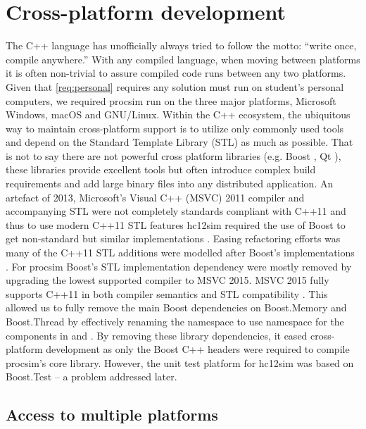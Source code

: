 \section{Cross-platform development}
\label{sec:cross-platform:sec:cross-platform-development}

The C++ language has unofficially always tried to follow the motto: ``write once, compile anywhere.'' With any compiled language, when moving between platforms it is often non-trivial to assure compiled code runs between any two platforms. Given that \cref{req:personal} requires any solution must run on student's personal computers, we required procsim run on the three major platforms, Microsoft Windows, macOS and GNU/Linux. Within the C++ ecosystem, the ubiquitous way to maintain cross-platform support is to utilize only commonly used tools and depend on the Standard Template Library (STL) as much as possible. That is not to say there are not powerful cross platform libraries (e.g. Boost \cite{Boost}, Qt \cite{Qt}), these libraries provide excellent tools but often introduce complex build requirements and add large binary files into any distributed application. An artefact of 2013, Microsoft's Visual C++ (MSVC) 2011 compiler and accompanying STL were not completely standards compliant with C++11 and thus to use modern C++11 STL features hc12sim required the use of Boost to get non-standard but similar implementations \cite{Microsoft:MSVC:ModernCPP:2011}. Easing refactoring efforts was many of the C++11 STL additions were modelled after Boost's implementations \cite{Meyers2005}. For procsim Boost's STL implementation dependency were mostly removed by upgrading the lowest supported compiler to MSVC 2015. MSVC 2015 fully supports C++11 in both compiler semantics and STL compatibility \cite{Microsoft:MSVC:ModernCPP}. This allowed us to fully remove the main Boost dependencies on Boost.Memory and Boost.Thread by effectively renaming the  namespace to use  namespace for the components in  and . By removing these library dependencies, it eased cross-platform development as only the Boost C++ headers were required to compile procsim's core library. However, the unit test platform for hc12sim was based on Boost.Test \cite{Boost1.53.0:Test} -- a problem addressed later.

\subsection{Access to multiple platforms}

